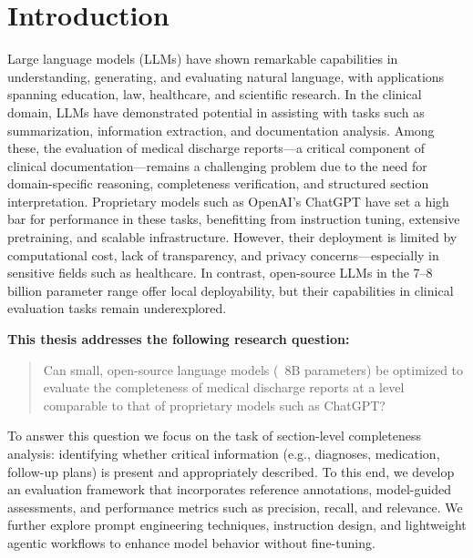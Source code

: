 \section{Introduction}
Large language models (LLMs) have shown remarkable capabilities in understanding, 
generating, and evaluating natural language, with applications spanning education, 
law, healthcare, and scientific research. 
In the clinical domain, LLMs have demonstrated potential in assisting with tasks 
such as summarization, information extraction, and documentation analysis. 
Among these, the evaluation of medical discharge reports—a critical component of 
clinical documentation—remains a challenging problem due to the need for 
domain-specific reasoning, completeness verification, 
and structured section interpretation.
Proprietary models such as OpenAI’s ChatGPT have set a high bar for performance 
in these tasks, benefitting from instruction tuning, extensive pretraining, and 
scalable infrastructure. 
However, their deployment is limited by computational cost, lack of transparency, 
and privacy concerns—especially in sensitive fields such as healthcare. 
In contrast, open-source LLMs in the 7–8 billion parameter range offer local 
deployability, but their capabilities in clinical evaluation tasks remain underexplored.

\vspace{2\baselineskip}

\textbf{This thesis addresses the following research question:}

\begin{quote}
Can small, open-source language models (~8B parameters) be optimized to evaluate the completeness of medical discharge reports at a level comparable to that of proprietary models such as ChatGPT?
\end{quote}

To answer this question we focus on the task of section-level completeness analysis: 
identifying whether critical information (e.g., diagnoses, medication, follow-up plans) 
is present and appropriately described. 
To this end, we develop an evaluation framework that incorporates reference annotations, 
model-guided assessments, and performance metrics such as precision, recall, and relevance.
We further explore prompt engineering techniques, instruction design, 
and lightweight agentic workflows to enhance model behavior without fine-tuning. 

\clearpage

